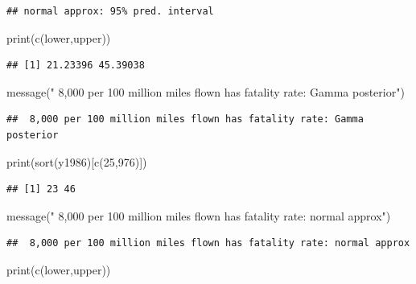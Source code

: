\documentclass[
]{book}
\newenvironment{Shaded}{\begin{snugshade}}{\end{snugshade}}
\newcommand{\DecValTok}[1]{\textcolor[rgb]{0.00,0.00,0.81}{#1}}
\newcommand{\FunctionTok}[1]{\textcolor[rgb]{0.00,0.00,0.00}{#1}}
\newcommand{\NormalTok}[1]{#1}
\newcommand{\StringTok}[1]{\textcolor[rgb]{0.31,0.60,0.02}{#1}}
\theoremstyle{definition}
\theoremstyle{definition}
\theoremstyle{definition}
\theoremstyle{definition}
\theoremstyle{remark}
\begin{document}
\begin{verbatim}
## normal approx: 95% pred. interval
\end{verbatim}

\begin{Shaded}
\begin{Highlighting}[]
 \FunctionTok{print}\NormalTok{(}\FunctionTok{c}\NormalTok{(lower,upper))}
\end{Highlighting}
\end{Shaded}

\begin{verbatim}
## [1] 21.23396 45.39038
\end{verbatim}

\begin{Shaded}
\begin{Highlighting}[]
 \FunctionTok{message}\NormalTok{(}\StringTok{" 8,000 per 100 million miles flown has fatality rate: Gamma posterior"}\NormalTok{)}
\end{Highlighting}
\end{Shaded}

\begin{verbatim}
##  8,000 per 100 million miles flown has fatality rate: Gamma posterior
\end{verbatim}

\begin{Shaded}
\begin{Highlighting}[]
 \FunctionTok{print}\NormalTok{(}\FunctionTok{sort}\NormalTok{(y1986)[}\FunctionTok{c}\NormalTok{(}\DecValTok{25}\NormalTok{,}\DecValTok{976}\NormalTok{)])}
\end{Highlighting}
\end{Shaded}

\begin{verbatim}
## [1] 23 46
\end{verbatim}

\begin{Shaded}
\begin{Highlighting}[]
 \FunctionTok{message}\NormalTok{(}\StringTok{" 8,000 per 100 million miles flown has fatality rate: normal approx"}\NormalTok{)}
\end{Highlighting}
\end{Shaded}

\begin{verbatim}
##  8,000 per 100 million miles flown has fatality rate: normal approx
\end{verbatim}

\begin{Shaded}
\begin{Highlighting}[]
 \FunctionTok{print}\NormalTok{(}\FunctionTok{c}\NormalTok{(lower,upper))}
\end{Highlighting}
\end{Shaded}
\end{document}
